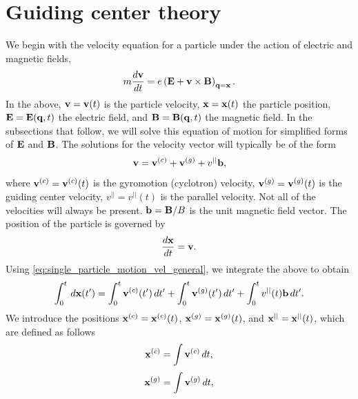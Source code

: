 \documentclass[a4paper,11pt]{report}
\begin{document}
\chapter{Guiding center theory}
We begin with the velocity equation for a particle under the action of electric and magnetic fields, 
\begin{equation}
\label{eq:single_particle_motion}
    m \frac{d \mathbf{v}}{dt} = e \left ( \mathbf{E} + \mathbf{v} \times \mathbf{B} \right )_{\mathbf{q} = \mathbf{x}}.
\end{equation}
In the above, $\mathbf{v} = \mathbf{v}(t)$ is the particle velocity, $\mathbf{x} = \mathbf{x}(t)$ the particle position, $\mathbf{E} = \mathbf{E}(\mathbf{q},t)$ the electric field, and $\mathbf{B} = \mathbf{B}(\mathbf{q},t)$ the magnetic field. In the subsections that follow, we will solve this equation of motion for simplified forms of $\mathbf{E}$ and $\mathbf{B}$. The solutions for the velocity vector will typically be of the form
\begin{equation}
    \label{eq:single_particle_motion_vel_general}
    \mathbf{v} = \mathbf{v}^{(c)} + \mathbf{v}^{(g)} + v^{||} \mathbf{b},
\end{equation}
where $\mathbf{v}^{(c)} = \mathbf{v}^{(c)}(t)$ is the gyromotion (cyclotron) velocity, $\mathbf{v}^{(g)} = \mathbf{v}^{(g)}(t)$ is the guiding center velocity, $v^{||} = v^{||}(t)$ is the parallel velocity. Not all of the velocities will always be present. $\mathbf{b} = \mathbf{B} / B$ is the unit magnetic field vector. The position of the particle is governed by 
\begin{equation}
    \frac{d\mathbf{x}}{dt} = \mathbf{v}.
\end{equation}
Using \cref{eq:single_particle_motion_vel_general}, we integrate the above to obtain
\begin{equation}
    \label{eq:single_particle_motion_pos_eq_mod}
    \int_0^t \, d\mathbf{x}(t') = \int_0^t \mathbf{v}^{(c)}(t') \, dt' + \int_0^t \mathbf{v}^{(g)}(t') \, dt' + \int_0^t v^{||}(t) \mathbf{b} \, dt'.
\end{equation}
We introduce the positions $\mathbf{x}^{(c)} = \mathbf{x}^{(c)}(t)$, $\mathbf{x}^{(g)} = \mathbf{x}^{(g)}(t)$, and $\mathbf{x}^{||} = \mathbf{x}^{||}(t)$, which are defined as follows
\begin{equation}
    \mathbf{x}^{(c)} = \int \mathbf{v}^{(c)} \, dt,
\end{equation}
\begin{equation}
    \mathbf{x}^{(g)} = \int \mathbf{v}^{(g)} \, dt,
\end{equation}
\end{document}

